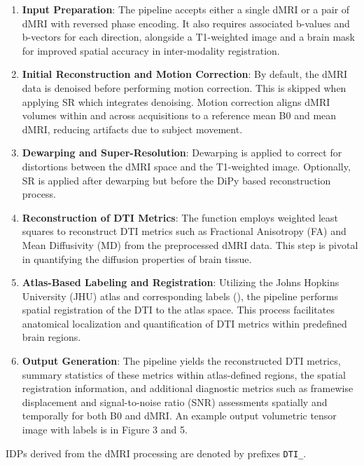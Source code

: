 \documentclass[
  table]{article}
\begin{document}
\begin{enumerate}
\def\labelenumi{\arabic{enumi}.}
\item
  \textbf{Input Preparation}: The pipeline accepts either a single dMRI
  or a pair of dMRI with reversed phase encoding. It also requires
  associated b-values and b-vectors for each direction, alongside a
  T1-weighted image and a brain mask for improved spatial accuracy in
  inter-modality registration.
\item
  \textbf{Initial Reconstruction and Motion Correction}: By default, the
  dMRI data is denoised before performing motion correction. This is
  skipped when applying SR which integrates denoising. Motion correction
  aligns dMRI volumes within and across acquisitions to a reference mean
  B0 and mean dMRI, reducing artifacts due to subject movement.
\item
  \textbf{Dewarping and Super-Resolution}: Dewarping is applied to
  correct for distortions between the dMRI space and the T1-weighted
  image. Optionally, SR is applied after dewarping but before the DiPy
  based reconstruction process.
\item
  \textbf{Reconstruction of DTI Metrics}: The function employs weighted
  least squares to reconstruct DTI metrics such as Fractional Anisotropy
  (FA) and Mean Diffusivity (MD) from the preprocessed dMRI data. This
  step is pivotal in quantifying the diffusion properties of brain
  tissue.
\item
  \textbf{Atlas-Based Labeling and Registration}: Utilizing the Johns
  Hopkins University (JHU) atlas and corresponding labels
  (), the
  pipeline performs spatial registration of the DTI to the atlas space.
  This process facilitates anatomical localization and quantification of
  DTI metrics within predefined brain regions.
\item
  \textbf{Output Generation}: The pipeline yields the reconstructed DTI
  metrics, summary statistics of these metrics within atlas-defined
  regions, the spatial registration information, and additional
  diagnostic metrics such as framewise displacement and signal-to-noise
  ratio (SNR) assessments spatially and temporally for both B0 and dMRI.
  An example output volumetric tensor image with labels is in Figure 3
  and 5.
\end{enumerate}

IDPs derived from the dMRI processing are denoted by prefixes
\texttt{DTI\_}.
\end{document}
